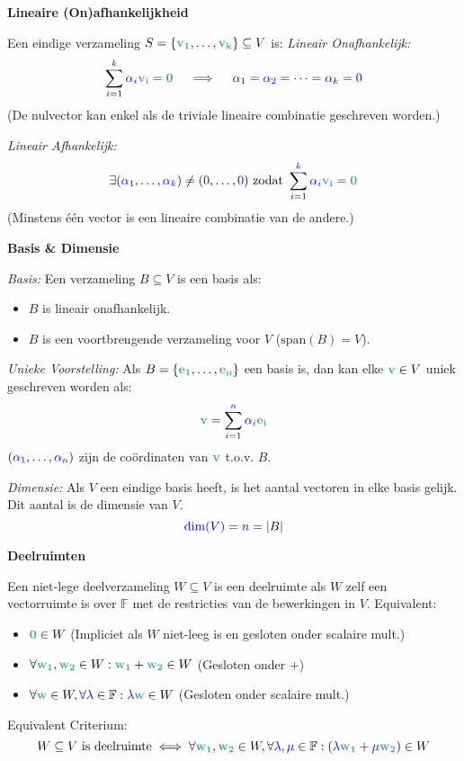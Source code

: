 \documentclass[12pt]{article}
\renewcommand{\vec}[1]{\textcolor{vectorTeal}{\mathbf{#1}}}
\newcommand{\scalar}[1]{\textcolor{scalarBrightBlue}{#1}}
\newcommand{\field}[1]{\mathbb{#1}}
\begin{document}
\vspace{1.5em} %
{\centering
\textcolor{headerBrown}{\large\textbf{Lineaire (On)afhankelijkheid}}
\par
}%
Een eindige verzameling $S = \{\vec{v_1}, \dots, \vec{v_k}\} \subseteq V$ is:
\textit{Lineair Onafhankelijk:}
\[
\sum_{i=1}^{\scalar{k}} \scalar{\alpha_i} \vec{v_i} = \vec{0} \quad \implies \quad \scalar{\alpha_1} = \scalar{\alpha_2} = \dots = \scalar{\alpha_k} = \scalar{0}
\]
(De nulvector kan enkel als de triviale lineaire combinatie geschreven worden.)

\textit{Lineair Afhankelijk:}
\[
\exists (\scalar{\alpha_1}, \dots, \scalar{\alpha_k}) \neq (\scalar{0}, \dots, \scalar{0}) \text{ zodat } \sum_{i=1}^{\scalar{k}} \scalar{\alpha_i} \vec{v_i} = \vec{0}
\]
(Minstens één vector is een lineaire combinatie van de andere.)

\vspace{1.5em} %
{\centering
\textcolor{headerBrown}{\large\textbf{Basis & Dimensie}}
\par
}%
\textit{Basis:} Een verzameling $B \subseteq V$ is een basis als:
\begin{itemize}
    \item $B$ is lineair onafhankelijk.
    \item $B$ is een voortbrengende verzameling voor $V$ ($\text{span}(B) = V$).
\end{itemize}
\textit{Unieke Voorstelling:} Als $B = \{\vec{e_1}, \dots, \vec{e_n}\}$ een basis is, dan kan elke $\vec{v} \in V$ uniek geschreven worden als:
\[
\vec{v} = \sum_{i=1}^{\scalar{n}} \scalar{\alpha_i} \vec{e_i}
\]
$(\scalar{\alpha_1}, \dots, \scalar{\alpha_n})$ zijn de coördinaten van $\vec{v}$ t.o.v. $B$.

\textit{Dimensie:} Als $V$ een eindige basis heeft, is het aantal vectoren in elke basis gelijk. Dit aantal is de dimensie van $V$.
\[
\scalar{\dim(V)} = \scalar{n} = |B|
\]

\vspace{1.5em} %
{\centering
\textcolor{headerBrown}{\large\textbf{Deelruimten}}
\par
}%
Een niet-lege deelverzameling $W \subseteq V$ is een deelruimte als $W$ zelf een vectorruimte is over $\field{F}$ met de restricties van de bewerkingen in $V$. Equivalent:
\begin{itemize}
    \item $\vec{0} \in W$ (Impliciet als $W$ niet-leeg is en gesloten onder scalaire mult.)
    \item $\forall \vec{w_1}, \vec{w_2} \in W : \vec{w_1} + \vec{w_2} \in W$ (Gesloten onder +)
    \item $\forall \vec{w} \in W, \forall \scalar{\lambda} \in \field{F} : \scalar{\lambda}\vec{w} \in W$ (Gesloten onder scalaire mult.)
\end{itemize}
Equivalent Criterium:
\[
W \subseteq V \text{ is deelruimte} \iff \forall \vec{w_1}, \vec{w_2} \in W, \forall \scalar{\lambda, \mu} \in \field{F} : (\scalar{\lambda}\vec{w_1} + \scalar{\mu}\vec{w_2}) \in W
\]
\end{document}
